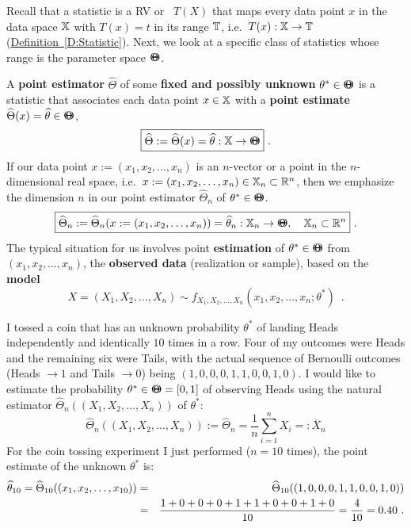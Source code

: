 Recall that a statistic is a RV or \rv~$T(X)$ that maps every data point $x$ in the data space $\mathbb{X}$ with $T(x)=t$ in its range $\mathbb{T}$, i.e.~$T(x):\mathbb{X} \to \mathbb{T}$ (\hyperref[D:Statistic]{Definition~\ref*{D:Statistic}}).  
Next, we look at a specific class of statistics whose range is the parameter space ${\Theta}\mspace{-11 mu}{\Theta}$.

\begin{definition}\label{D:Estimator}
A {\bf point estimator} $\widehat{\Theta}$ of some {\bf fixed and possibly unknown} $\theta^* \in {\Theta}\mspace{-11 mu}{\Theta}$ is a statistic that associates each data point $x \in \mathbb{X}$ with a {\bf point estimate} $\widehat{\Theta}(x)=\widehat{\theta} \in {\Theta}\mspace{-11 mu}{\Theta}$,  
\[
\boxed{
 \widehat{\Theta} := \widehat{\Theta}(x)=\widehat{\theta}: \mathbb{X} \to {\Theta}\mspace{-11 mu}{\Theta}
 } \ .
\]
If our data point $x := (x_1,x_2,\ldots,x_n)$ is an $n$-vector or a point in the $n$-dimensional real space, i.e.~$x := (x_1,x_2,\ldots,x_n) \in \mathbb{X}_n \subset \mathbb{R}^n$, then we emphasize the dimension $n$ in our point estimator $\widehat{\Theta}_n$ of $\theta^* \in {\Theta}\mspace{-11 mu}{\Theta}$.
\[
\boxed{
\widehat{\Theta}_n :=  \widehat{\Theta}_n(x:=(x_1,x_2,\ldots,x_n))=\widehat{\theta}_n : \mathbb{X}_n \to {\Theta}\mspace{-11 mu}{\Theta}, \quad \mathbb{X}_n \subset \mathbb{R}^n 
} \ .
\]
The typical situation for us involves point {\bf estimation} of $\theta^* \in {\Theta}\mspace{-11 mu}{\Theta}$ from 
$(x_1,x_2,\ldots,x_n)$, the {\bf observed data} (realization or sample), based on the {\bf model}
\[
X=(X_1,X_2,\ldots,X_n) \sim f_{X_1,X_2,\ldots,X_n}(x_1,x_2,\ldots,x_n; \theta^*) \enspace .
\]
\end{definition}

\begin{example}\label{EX:CoinTossing}
{\rm
I tossed a coin that has an unknown probability $\theta^*$ of landing Heads independently and identically $10$ times in a row.  Four of my outcomes were Heads and the remaining six were Tails, with the actual sequence of Bernoulli outcomes (Heads $\to 1$ and Tails $\to 0$) being $(1,0,0,0,1,1,0,0,1,0)$.  I would like to estimate the probability $\theta^* \in {\Theta}\mspace{-11 mu}{\Theta} = [0,1]$ of observing Heads using the natural estimator $\widehat{\Theta}_n((X_1,X_2,\ldots,X_n))$ of $\theta^*$:
\[
\widehat{\Theta}_n((X_1,X_2,\ldots,X_n)) := \widehat{\Theta}_n = \frac{1}{n} \sum_{i=1}^n X_i =: \overline{X}_n
\]
For the coin tossing experiment I just performed ($n=10$ times), the point estimate of the unknown $\theta^*$ is:
\begin{eqnarray}
\widehat{\theta}_{10} = \widehat{\Theta}_{10}((x_1,x_2,\ldots,x_{10})) 
&=&\widehat{\Theta}_{10}((1,0,0,0,1,1,0,0,1,0)) \notag \\
&=& \frac{1+0+0+0+1+1+0+0+1+0}{10}=\frac{4}{10}=0.40 \notag \ .
\end{eqnarray}
}
\end{example}

